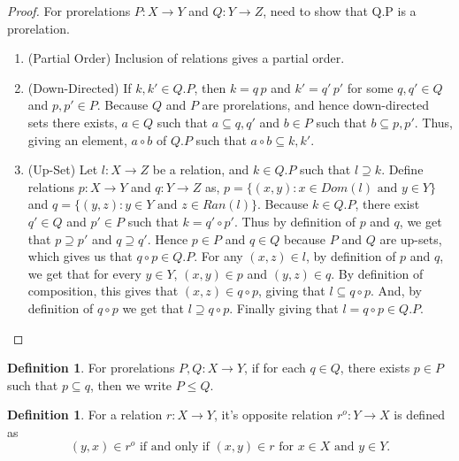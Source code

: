 \documentclass[a4paper]{article}
\theoremstyle{definition}
\newtheorem{definition}[theorem]{Definition}
\begin{document}
			\begin{proof}\setcounter{equation}{0}

				For prorelations $P:X \to Y$ and $Q:Y \to Z$, need to show that Q.P is a prorelation.
				\begin{enumerate}[label=(\roman*)]
					\item (Partial Order) Inclusion of relations gives a partial order.
					\item (Down-Directed) If $k,k' \in Q.P$, then $k=q\,p$ and $k'=q'\,p'$ for some
						$q,q' \in Q$ and $p,p' \in P$. Because $Q$ and $P$ are prorelations,
						and hence down-directed sets there exists, $a \in Q$ such that
						$ a\subseteq q,q'$ and $b \in P$ such that $b \subseteq p,p'$. Thus,
						giving an element, $a\circ b$ of $Q.P$ such that $a \circ b \subseteq k, k'$.
					\item (Up-Set) Let $l:X \to Z$ be a relation, and $k \in Q.P$ such that $l \supseteq k$.
						Define relations $ p:X \to Y $ and $q:Y \to Z$ as,
						$p=\{(x,y): x \in Dom(l) \text{ and } y \in Y\}$ and
						$q=\{(y,z):  y \in Y \text{ and } z \in Ran(l)\}$.
						Because $k\in Q.P$, there exist $q'\in Q$ and $p' \in P$ such that
						$k = q' \circ p'$. Thus by definition of $p$ and $q$, we get that
						$p \supseteq p'$ and $q \supseteq q'$. Hence $p \in P$ and $q \in Q$ because
						$P$ and $Q$ are up-sets, which gives us that $q\circ p \in Q.P$.
						For any $(x,z) \in l$, by definition
						of $p$ and $q$, we get that for every $y \in Y$, $(x,y) \in p$ and
						$(y,z) \in q $. By
						definition of composition, this gives that $(x,z) \in q \circ p$,
						giving that $l \subseteq q \circ p$. And, by definition
						of $q \circ p$ we get that $l \supseteq q \circ p$. Finally giving that
						$l=q \circ p \in Q.P$. \qedhere
				\end{enumerate}
			\end{proof}
			\begin{definition} %

				For prorelations $P,Q:X\to Y$, if for each $q \in Q$, there exists $p \in P$ such that
				$p \subseteq q$, then we write $P\leq Q$.
			\end{definition}
			\begin{definition} %
				For a relation $r:X \to Y$, it's opposite relation $r^o:Y \to X$ is defined as
				\[ (y,x) \in r^o \text{ if and only if } (x,y)\in r  \text{ for } x\in X \text{ and }
				y \in Y.\]
			\end{definition}
\end{document}
